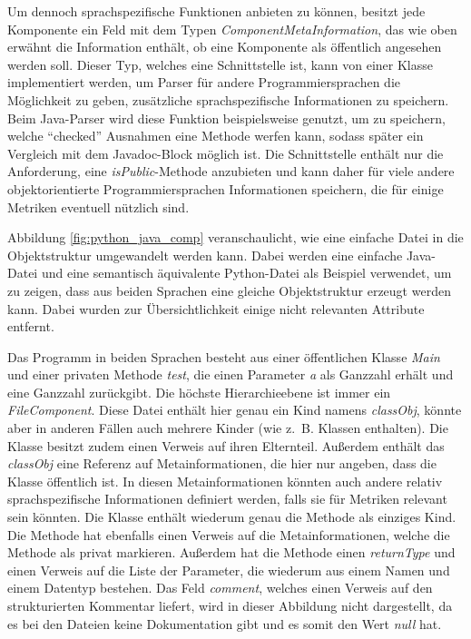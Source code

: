 Um dennoch sprachspezifische Funktionen anbieten zu können, besitzt jede Komponente ein Feld mit dem Typen \textit{ComponentMetaInformation}, das wie oben erwähnt die Information enthält, ob eine Komponente als öffentlich angesehen werden soll. Dieser Typ, welches eine Schnittstelle ist, kann von einer Klasse implementiert werden, um Parser für andere Programmiersprachen die Möglichkeit zu geben, zusätzliche sprachspezifische Informationen zu speichern. Beim Java-Parser wird diese Funktion beispielsweise genutzt, um zu speichern, welche \enquote{checked} Ausnahmen eine Methode werfen kann, sodass später ein Vergleich mit dem Javadoc-Block möglich ist. Die Schnittstelle enthält nur die Anforderung, eine \textit{isPublic}-Methode anzubieten und kann daher für viele andere objektorientierte Programmiersprachen Informationen speichern, die für einige Metriken eventuell nützlich sind. 





Abbildung \ref{fig:python_java_comp} veranschaulicht, wie eine einfache Datei in die Objektstruktur umgewandelt werden kann. Dabei werden eine einfache Java-Datei und eine semantisch äquivalente Python-Datei als Beispiel verwendet, um zu zeigen, dass aus beiden Sprachen eine gleiche Objektstruktur erzeugt werden kann. Dabei wurden zur Übersichtlichkeit einige nicht relevanten Attribute entfernt.



Das Programm in beiden Sprachen besteht aus einer öffentlichen Klasse \textit{Main} und einer privaten Methode \textit{test}, die einen Parameter \textit{a} als Ganzzahl erhält und eine Ganzzahl zurückgibt. Die höchste Hierarchieebene ist immer ein \textit{FileComponent}. Diese Datei enthält hier genau ein Kind namens \textit{classObj}, könnte aber in anderen Fällen auch mehrere Kinder (wie z.~B. Klassen enthalten). Die Klasse besitzt zudem einen Verweis auf ihren Elternteil. Außerdem enthält das \textit{classObj} eine Referenz auf Metainformationen, die hier nur angeben, dass die Klasse öffentlich ist. In diesen Metainformationen könnten auch andere relativ sprachspezifische Informationen definiert werden, falls sie für Metriken relevant sein könnten. Die Klasse enthält wiederum genau die Methode als einziges Kind. Die Methode hat ebenfalls einen Verweis auf die Metainformationen, welche die Methode als privat markieren. Außerdem hat die Methode einen \textit{returnType} und einen Verweis auf die Liste der Parameter, die wiederum aus einem Namen und einem Datentyp bestehen. Das Feld \textit{comment}, welches einen Verweis auf den strukturierten Kommentar liefert, wird in dieser Abbildung nicht dargestellt, da es bei den Dateien keine Dokumentation gibt und es somit den Wert \textit{null} hat.

